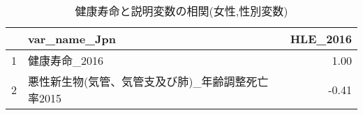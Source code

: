 \begin{table}[H]
\centering
\caption{健康寿命と説明変数の相関(女性,性別変数)}
\label{HLE_d_f_corr.tex}
\begingroup\tiny

\begin{adjustbox}{width=.5\textwidth}
\begin{tabular}{rlr}
  \hline
 & var\_name\_Jpn & HLE\_2016 \\
  \hline
1 & 健康寿命\_2016 & 1.00 \\
  2 & 悪性新生物(気管、気管支及び肺)\_年齢調整死亡率2015 & -0.41 \\
   \hline
\end{tabular}
\end{adjustbox}

\endgroup
\end{table}
